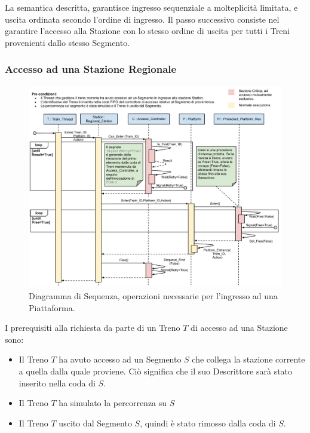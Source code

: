	La semantica descritta, garantisce ingresso sequenziale a molteplicità limitata, e uscita ordinata secondo l'ordine di ingresso. Il passo successivo consiste nel garantire l'accesso alla Stazione con lo stesso ordine di uscita per tutti i Treni provenienti dallo stesso Segmento.


		\subsubsection{Accesso ad una Stazione Regionale}\label{subsubsec:regional_station_access}
		
		\begin{figure}[htbp]
			\includegraphics[trim = 45mm 0mm 0mm 0mm,scale=0.53]{imgs/platform_access_Sequence_Diagram.pdf}
			\caption{\footnotesize{Diagramma di Sequenza, operazioni necessarie per l'ingresso ad una Piattaforma.}}
			\label{fig:platform_access}
		\end{figure}
		
		I prerequisiti alla richiesta da parte di un Treno $T$ di accesso ad una Stazione sono:
		
			\begin{itemize}
				\item Il Treno $T$ ha avuto accesso ad un Segmento $S$ che collega la stazione corrente a quella dalla quale proviene. Ciò significa che il suo Descrittore sarà stato inserito nella coda  di $S$.
				\item Il Treno $T$ ha simulato la percorrenza su $S$ 
				\item Il Treno $T$ uscito dal Segmento $S$, quindi è stato rimosso dalla coda  di $S$.
			\end{itemize}
			
